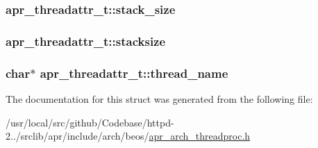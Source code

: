 \subsubsection[{\texorpdfstring{stack\+\_\+size}{stack_size}}]{ apr\+\_\+threadattr\+\_\+t\+::stack\+\_\+size}\hypertarget{structapr__threadattr__t_ab0c95add41d5f494fb28b373fb549f33}{}\label{structapr__threadattr__t_ab0c95add41d5f494fb28b373fb549f33}
\subsubsection[{\texorpdfstring{stacksize}{stacksize}}]{ apr\+\_\+threadattr\+\_\+t\+::stacksize}\hypertarget{structapr__threadattr__t_afa9476d4c71309de2f452e11b7d07aeb}{}\label{structapr__threadattr__t_afa9476d4c71309de2f452e11b7d07aeb}
\subsubsection[{\texorpdfstring{thread\+\_\+name}{thread_name}}]{\setlength{\rightskip}{0pt plus 5cm}char$\ast$ apr\+\_\+threadattr\+\_\+t\+::thread\+\_\+name}\hypertarget{structapr__threadattr__t_af04e3acad7d29855ff0fc82e6aa048e0}{}\label{structapr__threadattr__t_af04e3acad7d29855ff0fc82e6aa048e0}


The documentation for this struct was generated from the following file\+:\begin{DoxyCompactItemize}
\item 
/usr/local/src/github/\+Codebase/httpd-\/2../srclib/apr/include/arch/beos/\hyperlink{beos_2apr__arch__threadproc_8h}{apr\+\_\+arch\+\_\+threadproc.\+h}\end{DoxyCompactItemize}
